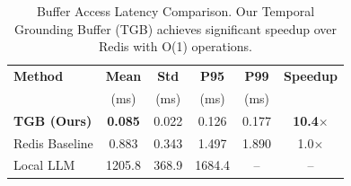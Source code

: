 
\begin{table}[t]
\centering
\caption{Buffer Access Latency Comparison. Our Temporal Grounding Buffer (TGB)
achieves significant speedup over Redis with O(1) operations.}
\label{tab:latency_comparison}
\begin{tabular}{l c c c c c}
\toprule
\textbf{Method} & \textbf{Mean} & \textbf{Std} & \textbf{P95} & \textbf{P99} & \textbf{Speedup} \\
 & (ms) & (ms) & (ms) & (ms) & \\
\midrule
\textbf{TGB (Ours)} & \textbf{0.085} & 0.022 & 0.126 & 0.177 & \textbf{10.4$\times$} \\
Redis Baseline & 0.883 & 0.343 & 1.497 & 1.890 & 1.0$\times$ \\
Local LLM & 1205.8 & 368.9 & 1684.4 & -- & -- \\

\bottomrule
\end{tabular}
\end{table}
